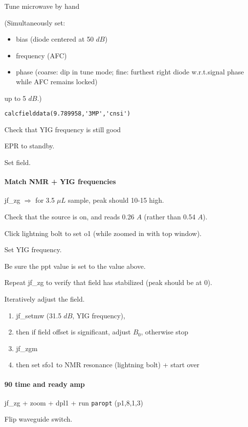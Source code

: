 Tune microwave by hand
{\small (Simultaneously set:
\begin{itemize}
    \item bias (diode centered at 50 $dB$)
    \item frequency (AFC)
    \item phase (coarse: dip in tune mode; fine: furthest right diode w.r.t.signal phase while AFC remains locked)
\end{itemize}
up to 5 $dB$.)}
\begin{lstlisting}
calcfielddata(9.789958,'3MP','cnsi')
\end{lstlisting}

Check that YIG frequency is still good

EPR to standby.

Set field.

\paragraph{ Match NMR + YIG frequencies}
jf\_zg $\Rightarrow$ for 3.5 $\mu L$ sample, peak should 10-15 high.

Check that the source is on, and reads 0.26 $A$ (rather than 0.54 $A$).

Click lightning bolt to set o1 (while zoomed in with top window).

Set YIG frequency.

Be sure the ppt value is set to the value above.

Repeat jf\_zg to verify that field has stabilized (peak should be at 0).

Iteratively adjust the field.
{\small
\begin{enumerate}
	\item jf\_setmw (31.5 $dB$, YIG frequency),
	\item then if field offset is significant, adjust $B_0$, otherwise stop
	\item jf\_zgm
	\item then set sfo1 to NMR resonance (lightning bolt) + start over
\end{enumerate}
}

\paragraph{90 time and ready amp}
jf\_zg + zoom + dpl1 + run {\tt paropt} (p1,8,1,3)

Flip waveguide switch.

